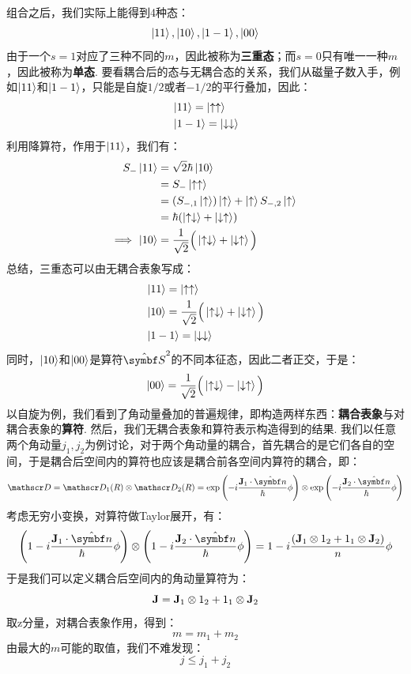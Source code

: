组合之后，我们实际上能得到4种态：
\[
\ket{11},\ket{10},\ket{1-1},\ket{00}
\]
由于一个\(s=1\)对应了三种不同的\(m\)，因此被称为\textbf{三重态}；而\(s=0\)只有唯一一种\(m\)，因此被称为\textbf{单态}. 要看耦合后的态与无耦合态的关系，我们从磁量子数入手，例如\(\ket{11}\)和\(\ket{1-1}\)，只能是自旋\(1/2\)或者\(-1/2\)的平行叠加，因此：
\begin{align*}
& \ket{11} = \ket{\uparrow\uparrow} \\
& \ket{1-1} = \ket{\downarrow\downarrow}
\end{align*}
利用降算符，作用于\(\ket{11}\)，我们有：
\begin{align*}
{S}_{-}\ket{11}
& = \sqrt{2}\hbar\ket{10} \\
& = {S}_{-}\ket{\uparrow\uparrow} \\
& = ({S}_{-,1}\ket{\uparrow})\ket{\uparrow} + \ket{\uparrow}{S}_{-,2}\ket{\uparrow} \\
& = \hbar(\ket{\uparrow\downarrow} + \ket{\downarrow\uparrow}) \\
\Longrightarrow\ \ket{10}
& = \frac{1}{\sqrt{2}}\Big(\ket{\uparrow\downarrow}+\ket{\downarrow\uparrow}\Big)
\end{align*}
总结，三重态可以由无耦合表象写成：
\begin{align*}
& \ket{11} = \ket{\uparrow\uparrow} \\
& \ket{10} = \frac{1}{\sqrt{2}}\Big(\ket{\uparrow\downarrow}+\ket{\downarrow\uparrow}\Big) \\
& \ket{1-1} = \ket{\downarrow\downarrow}
\end{align*}
同时，\(\ket{10}\)和\(\ket{00}\)是算符\(\uv{S}^{2}\)的不同本征态，因此二者正交，于是：
\[
\ket{00} = \frac{1}{\sqrt{2}}\Big(\ket{\uparrow\downarrow}-\ket{\downarrow\uparrow}\Big)
\]
以自旋为例，我们看到了角动量叠加的普遍规律，即构造两样东西：\textbf{耦合表象}与对耦合表象的\textbf{算符}. 然后，我们无耦合表象和算符表示构造得到的结果. 我们以任意两个角动量\(j_{1},j_{2}\)为例讨论，对于两个角动量的耦合，首先耦合的是它们各自的空间，于是耦合后空间内的算符也应该是耦合前各空间内算符的耦合，即：
\[
\rotate = \rotate_{1}(R)\otimes\rotate_{2}(R) = \exp\br{-i\frac{\vJ_{1}\cdot\uv{n}}{\hh}\phi}\otimes\exp\br{-i\frac{\vJ_{2}\cdot\uv{n}}{\hh}\phi}
\]
考虑无穷小变换，对算符做Taylor展开，有：
\begin{align*}
\br{1-i\frac{\vJ_{1}\cdot\uv{n}}{\hh}\phi}\otimes\br{1-i\frac{\vJ_{2}\cdot\uv{n}}{\hh}\phi} = 1 - i\frac{\br{\vJ_{1}\otimes1_{2} + 1_{1}\otimes\vJ_{2}}}{n}\phi
\end{align*}
于是我们可以定义耦合后空间内的角动量算符为：
\[
\mathbf{J} = \mathbf{J}_{1}\otimes1_{2} + 1_{1}\otimes\mathbf{J}_{2} 
\]
取z分量，对耦合表象作用，得到：
\[
m = m_{1} + m_{2}
\]
由最大的\(m\)可能的取值，我们不难发现：
\[
j\leq j_{1} + j_{2} 
\]
